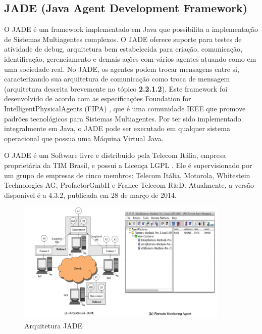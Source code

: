 \subsection{JADE (Java Agent Development Framework)}

O JADE \cite{telecon2014} é um framework implementado em Java que possibilita a implementação de Sistemas Multiagentes complexos. O JADE oferece suporte para testes de atividade de debug, arquitetura bem estabelecida para criação, comunicação, identificação, gerenciamento e demais ações com vários agentes atuando como em uma sociedade real. No JADE, os agentes podem trocar mensagens entre si, caracterizando sua arquitetura de comunicação como troca de mensagem (arquitetura descrita brevemente no tópico \textbf{2.2.1.2}). Este framework foi desenvolvido de acordo com as especificações Foundation for IntelligentPhysicalAgents (FIPA) \cite{telecon2014}, que é uma comunidade IEEE que promove padrões tecnológicos para Sistemas Multiagentes. Por ter sido implementado integralmente em Java, o JADE pode ser executado em qualquer sistema operacional que possua uma Máquina Virtual Java.

O JADE é um Software livre e distribuído pela Telecom Itália, empresa proprietária da TIM Brasil, e possui a Licença LGPL \cite{telecon2014}. Ele é supervisionado por um grupo de empresas de cinco membros: Telecom Itália, Motorola, Whitestein Technologies AG, ProfactorGmbH e France Telecom R\&D. Atualmente, a versão disponível é a 4.3.2, publicada em 28 de março de 2014.

\begin{figure}[h]
\centering
\label{f08}
\includegraphics[width=0.9\textwidth]{figuras/f08}
\caption{Arquitetura JADE}

\end{figure}


